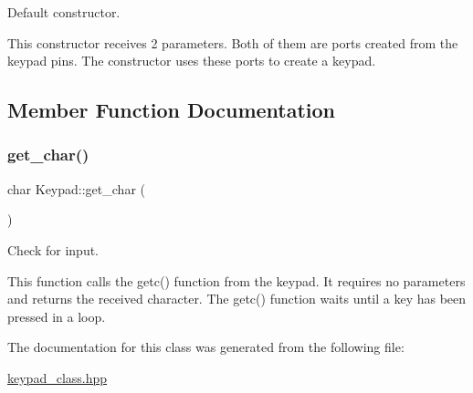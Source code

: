 Default constructor. 

This constructor receives 2 parameters. Both of them are ports created from the keypad pins. The constructor uses these ports to create a keypad. 

\subsection{Member Function Documentation}
\hypertarget{class_keypad_aef896a8cccb21f0b49579ed6d3c7e026}{}\label{class_keypad_aef896a8cccb21f0b49579ed6d3c7e026} 
\subsubsection{\texorpdfstring{get\+\_\+char()}{get\_char()}}
{\footnotesize\ttfamily char Keypad\+::get\+\_\+char (\begin{DoxyParamCaption}{ }\end{DoxyParamCaption})\hspace{0.3cm}{\ttfamily [inline]}}



Check for input. 

This function calls the getc() function from the keypad. It requires no parameters and returns the received character. The getc() function waits until a key has been pressed in a loop. 

The documentation for this class was generated from the following file\+:\begin{DoxyCompactItemize}
\item 
\hyperlink{keypad__class_8hpp}{keypad\+\_\+class.\+hpp}\end{DoxyCompactItemize}
